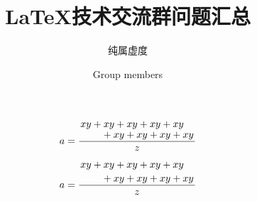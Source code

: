 \documentclass[violet]{tjbook}
\title{\LaTeX{}技术交流群问题汇总}
\subtitle{纯属虚度}
\author{Group members}%
\begin{document}
\maketitle
\makeflypage
\frontmatter
\tableofcontents

\mainmatter










\begin{codeshow}
\[
a=\frac{
\splitfrac{xy + xy + xy + xy + xy}
	       {+ xy + xy + xy + xy}
       }
       {z}
\]
\end{codeshow}
\begin{codeshow}
\[
a=\frac{
\splitdfrac{xy + xy + xy + xy + xy}
            {+ xy + xy + xy + xy}
	}
    {z}
\]
\end{codeshow}


\cleardoublepage
\setlength{\columnsep}{0.75cm}
\printindex

\makebackcover
\end{document}
